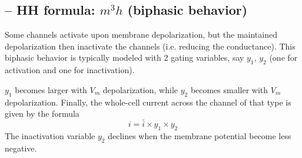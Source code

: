 %
%
%
%

\subsection{-- HH formula: $m^3h$ (biphasic behavior)}
\label{sec:HH_equations}
\label{sec:Hodgkin-Huxley_equations}
\label{sec:HH-biphasic-behavior}

Some channels activate upon membrane depolarization, but the maintained
depolarization then inactivate the channels (i.e. reducing the conductance).
This biphasic behavior is typically modeled with 2 gating variables, say $y_1$,
$y_2$ (one for activation and one for inactivation).

$y_1$ becomes larger with $V_m$ depolarization, while $y_2$ becomes smaller with
$V_m$ depolarization.  Finally, the whole-cell current across the channel of
that type is given by the formula
\begin{equation}
i = \bar{i} \times y_1 \times y_2
\end{equation}
The inactivation variable $y_2$ declines when the membrane potential become less
negative.


